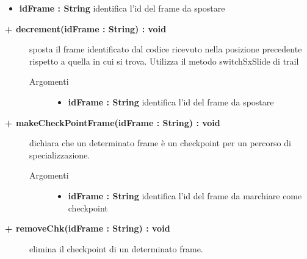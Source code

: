 \begin{description}
\begin{description}
\begin{description}
\begin{itemize}
					\item \textbf{idFrame : String			} \hfill
						identifica l'id del frame da spostare
					
				\end{itemize}
		\end{description}
	\end{description}
	
	\begin{description}
		\item[\textbf{\color{blue}+ decrement(idFrame : String) : void			}] \hfill
			sposta il frame identificato dal codice ricevuto nella posizione precedente rispetto a quella in cui si trova. Utilizza il metodo switchSxSlide di trail
			
		\begin{description}
			\item[Argomenti] \hfill
				\begin{itemize}
				
					\item \textbf{idFrame : String			} \hfill
						identifica l'id del frame da spostare
					
				\end{itemize}
		\end{description}
	\end{description}
	
	\begin{description}
		\item[\textbf{\color{blue}+ makeCheckPointFrame(idFrame : String) : void			}] \hfill
			dichiara che un determinato frame è un checkpoint per un percorso di specializzazione.
			
		\begin{description}
			\item[Argomenti] \hfill
				\begin{itemize}
				
					\item \textbf{idFrame : String			} \hfill
						identifica l'id del frame da marchiare come checkpoint
					
				\end{itemize}
		\end{description}
	\end{description}
	
	\begin{description}
		\item[\textbf{\color{blue}+ removeChk(idFrame : String) : void			}] \hfill
			elimina il checkpoint di un determinato frame.
			

\end{description}
\end{description}
